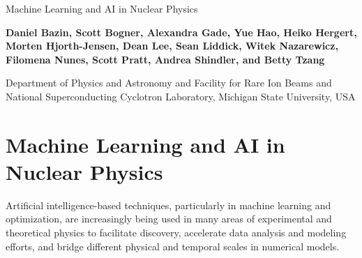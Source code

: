 \documentclass[%
oneside,                 %
final,                   %
10pt]{article}
\begin{document}

\newcommand{\exercisesection}[1]{\subsection*{#1}}






\thispagestyle{empty}

\begin{center}
{\LARGE\bf
\begin{spacing}{1.25}
Machine Learning and AI in Nuclear Physics
\end{spacing}
}
\end{center}


\begin{center}
{\bf Daniel Bazin, Scott Bogner, Alexandra Gade, Yue Hao, Heiko Hergert, Morten Hjorth-Jensen, Dean Lee, Sean Liddick, Witek Nazarewicz, Filomena Nunes, Scott Pratt, Andrea Shindler, and Betty Tzang}
\end{center}

    \begin{center}
{\small Department of Physics and Astronomy and Facility for Rare Ion Beams and National Superconducting Cyclotron Laboratory, Michigan State University, USA}
\end{center}
    


\section{Machine Learning and AI in Nuclear Physics}


Artificial intelligence-based techniques, particularly in machine
learning and optimization, are increasingly being used in many areas
of experimental and theoretical physics to facilitate discovery,
accelerate data analysis and modeling efforts, and bridge different
physical and temporal scales in numerical models.
\end{document}
